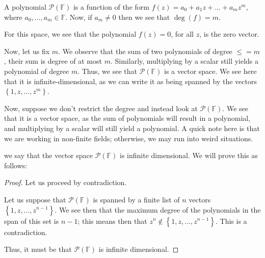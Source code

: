 \documentclass[openany]{book}
\begin{document}
	\begin{example}
		A polynomial $\mathscr{P}(\mathbb{F})$ is a function of the form $f(z) = a_{0} + a_{1}z + \ldots + a_{m}z^{m}$, where $a_{0}, \ldots, a_{m} \in \mathbb{F}$. Now, if $a_{m} \not= 0$ then we see that $\deg (f) = m$.
		
		For this space, we see that the polynomial $f(z) = 0$, for all $z$, is the zero vector.
		
		Now, let us fix $m$. We observe that the sum of two polynomials of degree $\leq= m$, their sum is degree of at most $m$. Similarly, multiplying by a scalar still yields a polynomial of degree $m$. Thus, we see that $\mathscr{P}(\mathbb{F})$ is a vector space. We see here that it is infinite-dimensional, as we can write it as being spanned by the vectors $\left\{  1, z, \ldots, z^{m}\right\}$.
		
		Now, suppose we don't restrict the degree and instead look at $\mathscr{P}\left( \mathbb{F} \right)$. We see that it is a vector space, as the sum of polynomials will result in a polynomial, and multiplying by a scalar will still yield a polynomial. A quick note here is that we are working in non-finite fields; otherwise, we may run into weird situations.
		
		we say that the vector space $\mathscr{P}(\mathbb{F})$ is infinite dimensional. We will prove this as follows:
		\begin{proof}
			Let us proceed by contradiction.
			
			Let us suppose that $\mathscr{P}\left( \mathbb{F} \right)$ is spanned by a finite list of $n$ vectors $\left\{  1, z, \ldots, z^{n-1} \right\}$. We see then that the maximum degree of the polynomials in the span of this set is $n-1$; this means then that $z^{n} \not\in \left\{  1, z, \ldots, z^{n-1} \right\}$. This is a contradiction.
			
			Thus, it must be that $\mathscr{P}(\mathbb{F})$ is infinite dimensional.
		\end{proof}
	\end{example}
\end{document}
